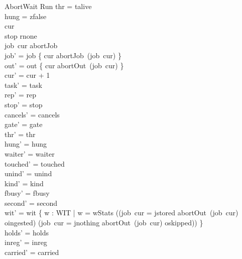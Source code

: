\documentclass[a4paper,10pt,fleqn]{article}
\begin{document}
\begin{schema}{AbortWait}
\Delta Run
\where
thr = talive \\
hung = zfalse \\
cur   \\
stop \neq rnone \\
job~cur \in \dom abortJob \\
job' = job \oplus \{ cur \mapsto abortJob~(job~cur) \} \\
out' = out \oplus \{ cur \mapsto abortOut~(job~cur) \} \\
cur' = cur + 1 \\
task' = task \\
rep' = rep \\
stop' = stop \\
cancels' = cancels \\
gate' = gate \\
thr' = thr \\
hung' = hung \\
waiter' = waiter \\
touched' = touched \\
unind' = unind \\
kind' = kind \\
fbusy' = fbusy \\
second' = second \\
wit' = wit \cup \{ w : WIT | w = wStats \land ((job~cur = jstored \land abortOut~(job~cur) \neq oingested) \lor (job~cur = jnothing \land abortOut~(job~cur) \neq oskipped)) \} \\
holds' = holds \\
inreg' = inreg \\
carried' = carried
\end{schema}
\end{document}
